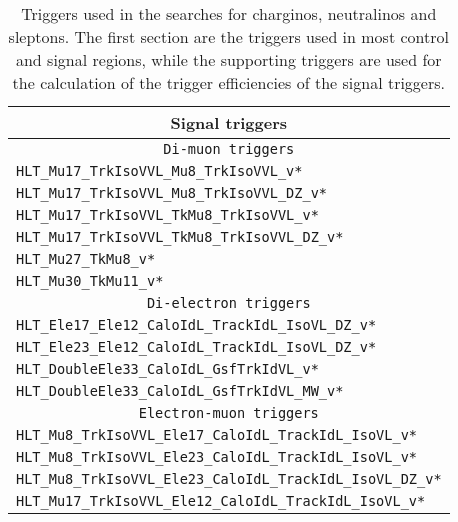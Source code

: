 \begin{table}[ht!]
\def\arraystretch{1.2}
    \caption{Triggers used in the searches for charginos, neutralinos and sleptons. The first section are the triggers used in most control and signal regions, while the supporting triggers are used for the calculation of the trigger efficiencies of the signal triggers.}
    \label{tab:triggers}
    \begin{center}
        \begin{tabular}{ l}
        \hline \hline
        \multicolumn{1}{c}{\textbf{Signal triggers} }             \\
        \hline 
        \multicolumn{1}{c}{\texttt{Di-muon triggers} }             \\
        \hline 
        \texttt{HLT\_Mu17\_TrkIsoVVL\_Mu8\_TrkIsoVVL\_v*}         \\
        \texttt{HLT\_Mu17\_TrkIsoVVL\_Mu8\_TrkIsoVVL\_DZ\_v*}      \\
        \texttt{HLT\_Mu17\_TrkIsoVVL\_TkMu8\_TrkIsoVVL\_v*}       \\
        \texttt{HLT\_Mu17\_TrkIsoVVL\_TkMu8\_TrkIsoVVL\_DZ\_v*}     \\
        \texttt{HLT\_Mu27\_TkMu8\_v*}                                \\ 
        \texttt{HLT\_Mu30\_TkMu11\_v*}                               \\
        \hline 
        \multicolumn{1}{c}{\texttt{Di-electron triggers} }             \\
        \hline 
        \texttt{HLT\_Ele17\_Ele12\_CaloIdL\_TrackIdL\_IsoVL\_DZ\_v*}   \\ 
        \texttt{HLT\_Ele23\_Ele12\_CaloIdL\_TrackIdL\_IsoVL\_DZ\_v*}    \\
        \texttt{HLT\_DoubleEle33\_CaloIdL\_GsfTrkIdVL\_v*}               \\
        \texttt{HLT\_DoubleEle33\_CaloIdL\_GsfTrkIdVL\_MW\_v*}               \\
        \hline 
        \multicolumn{1}{c}{\texttt{Electron-muon triggers} }             \\
        \hline 
        \texttt{HLT\_Mu8\_TrkIsoVVL\_Ele17\_CaloIdL\_TrackIdL\_IsoVL\_v*} \\
        \texttt{HLT\_Mu8\_TrkIsoVVL\_Ele23\_CaloIdL\_TrackIdL\_IsoVL\_v*}    \\
        \texttt{HLT\_Mu8\_TrkIsoVVL\_Ele23\_CaloIdL\_TrackIdL\_IsoVL\_DZ\_v*}    \\
        \texttt{HLT\_Mu17\_TrkIsoVVL\_Ele12\_CaloIdL\_TrackIdL\_IsoVL\_v*}    \\

\end{tabular}
\end{center}
\end{table}
